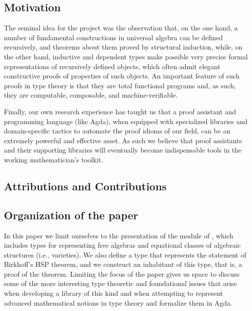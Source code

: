 \documentclass[a4paper,UKenglish,cleveref,autoref,thm-restate,12pt]{../lipics-v2021-wjd}
\begin{document}
\subsection{Motivation}\label{sec:motivation}
The seminal idea for the \agdaualib project was the observation that, on the one hand, a number of fundamental constructions in universal algebra can be defined recursively, and theorems about them proved by structural induction, while, on the other hand, inductive and dependent types make possible very precise formal representations of recursively defined objects, which often admit elegant constructive proofs of properties of such objects.  An important feature of such proofs in type theory is that they are total functional programs and, as such, they are computable, composable, and machine-verifiable.

Finally, our own research experience has taught us that a proof assistant and programming language (like Agda), when equipped with specialized libraries and domain-specific tactics to automate the proof idioms of our field, can be an extremely powerful and effective asset. As such we believe that proof assistants and their supporting libraries will eventually become indispensable tools in the working mathematician's toolkit.




\subsection{Attributions and Contributions}\label{sec:contributions}





\subsection{Organization of the paper}\label{sec:organization}

In this paper we limit ourselves to the presentation of the \ualibVarieties module of \ualib, which includes types for representing free algebras and equational classes of algebraic structures (i.e., varieties). We also define a type that represents the statement of Birkhoff's HSP theorem, and we construct an inhabitant of this type, that is, a proof of the theorem. Limiting the focus of the paper gives us space to discuss some of the more interesting type theoretic and foundational issues that arise when developing a library of this kind and when attempting to represent advanced mathematical notions in type theory and formalize them in Agda.
\end{document}
